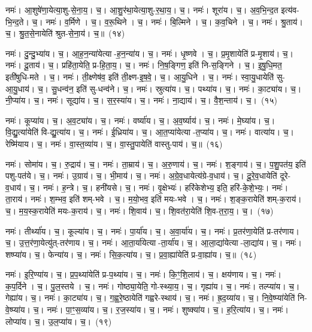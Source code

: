 नमः॑। आ॒शुषे॑णा॒येत्या॒शु-से॒ना॒य॒। च॒। आ॒शु॒र॑था॒येत्या॒शु-र॒था॒य॒। च॒। 
नमः॑। शूरा॑य। च॒। अ॒व॒भि॒न्द॒त इत्य॑व-भि॒न्द॒ते। च॒। 
नमः॑। व॒र्मिणे। च॒। व॒रू॒थिने। च॒। 
नमः॑। बि॒ल्मिने। च॒। क॒व॒चिने। च॒। 
नमः॑। श्रु॒ताय॑। च॒। श्रु॒त॒से॒नायेति॑ श्रुत-से॒ना॒य॑। च॒॥~(१४)


नमः॑। दु॒न्दु॒भ्या॑य। च॒। आ॒ह॒न॒न्या॑येत्या-ह॒न॒न्या॑य। च॒। 
नमः॑। धृ॒ष्णवे। च॒। प्र॒मृ॒शायेति॑ प्र-मृ॒शाय॑। च॒। 
नमः॑। दू॒ताय॑। च॒। प्रहि॑ता॒येति॒ प्र-हि॒ता॒य॒। च॒। 
नमः॑। नि॒ष॒ङ्गिण॒ इति॑ नि-स॒ङ्गिने। च॒। इ॒षु॒धि॒मत॒ इती॑षुधि-मते। च॒। 
नमः॑। ती॒क्ष्णेष॑व॒ इति॑ ती॒क्ष्ण-इ॒ष॒वे॒। च॒। आ॒यु॒धिने। च॒। 
नमः॑। स्वा॒यु॒धायेति॑ सु-आ॒यु॒धाय॑। च॒। सु॒धन्व॑न॒ इति॑ सु-धन्व॑ने। च॒। 
नमः॑। स्रुत्या॑य। च॒। पथ्या॑य। च॒। 
नमः॑। का॒ट्या॑य। च॒। नी॒प्या॑य। च॒। 
नमः॑। सूद्या॑य। च॒। स॒र॒स्या॑य। च॒। 
नमः॑। ना॒द्याय॑। च॒। वै॒श॒न्ताय॑। च॒।~(१५)


नमः॑। कूप्या॑य। च॒। अ॒व॒ट्या॑य। च॒। 
नमः॑। वर्ष्या॑य। च॒। अ॒व॒र्ष्याय॑। च॒। 
नमः॑। मे॒घ्या॑य। च॒। वि॒द्यु॒त्या॑येति॑ वि-द्यु॒त्या॑य। च॒। 
नमः॑। ई॒ध्रिया॑य। च॒। आ॒त॒प्या॑येत्या-त॒प्या॑य। च॒। 
नमः॑। वात्या॑य। च॒। रेष्मि॑याय। च॒। 
नमः॑। वा॒स्त॒व्या॑य। च॒। वा॒स्तु॒पायेति॑ वास्तु-पाय॑। च॒॥~(१६)


नमः॑। सोमा॑य। च॒। रु॒द्राय॑। च॒। 
नमः॑। ता॒म्राय॑। च॒। अ॒रु॒णाय॑। च॒। 
नमः॑। श॒ङ्गाय॑। च॒। प॒शु॒पत॑य॒ इति॑ पशु-पत॑ये। च॒। 
नमः॑। उ॒ग्राय॑। च॒। भी॒माय॑। च॒। 
नमः॑। अ॒ग्रे॒व॒धायेत्य॑ग्रे-व॒धाय॑। च॒। दू॒रे॒व॒धायेति॑ दूरे-व॒धाय॑। च॒। 
नमः॑। ह॒न्त्रे। च॒। हनी॑यसे। च॒। 
नमः॑। वृ॒क्षेभ्यः॑। हरि॑केशेभ्य॒ इति॒ हरि॑-के॒शे॒भ्यः॒। 
नमः॑। ता॒राय॑। नमः॑। श॒म्भव॒ इति॑ शम्-भवे। च॒। म॒यो॒भव॒ इति॑ मयः-भवे। च॒। 
नमः॑। श॒ङ्क॒रायेति॑ शम्-क॒राय॑। च॒। म॒य॒स्क॒रायेति॑ मयः-क॒राय॑। च॒। 
नमः॑। शि॒वाय॑। च॒। शि॒वत॑रा॒येति॑ शि॒व-त॒रा॒य॒। च॒।~(१७)


नमः॑। तीर्थ्या॑य। च॒। कूल्या॑य। च॒। 
नमः॑। पा॒र्या॑य। च॒। अ॒वा॒र्या॑य। च॒। 
नमः॑। प्र॒तर॑णा॒येति॑ प्र-तर॑णाय। च॒। उ॒त्त॒र॑णा॒येत्यु॑त्-तर॑णाय। च॒। 
नमः॑। आ॒ता॒र्या॑येत्या-ता॒र्या॑य। च॒। आ॒ला॒द्या॑येत्या-ला॒द्या॑य। च॒। 
नमः॑। शष्प्या॑य। च॒। फेन्या॑य। च॒। 
नमः॑। सि॒क॒त्या॑य। च॒। प्र॒वा॒ह्या॑येति॑ प्र-वा॒ह्या॑य। च॒॥~(१८)


नमः॑। इ॒रि॒ण्या॑य। च॒। प्र॒प॒थ्या॑येति॑ प्र-प॒थ्या॑य। च॒। 
नमः॑। कि॒ꣳ॒शि॒लाय॑। च॒। क्षय॑णाय। च॒। 
नमः॑। क॒प॒र्दिने। च॒। पु॒ल॒स्तये। च॒। 
नमः॑। गोष्ठ्या॒येति॒ गो-स्थ्या॒य॒। च॒। गृह्या॑य। च॒। 
नमः॑। तल्प्या॑य। च॒। गेह्या॑य। च॒। 
नमः॑। का॒ट्या॑य। च॒। ग॒ह्व॒रे॒ष्ठायेति॑ गह्वरे-स्थाय॑। च॒। 
नमः॑। ह्र॒द॒य्या॑य। च॒। नि॒वे॒ष्प्या॑येति॑ नि-वे॒ष्प्या॑य। च॒। 
नमः॑। पा॒ꣳ॒स॒व्या॑य। च॒। र॒ज॒स्या॑य। च॒। 
नमः॑। शुष्क्या॑य। च॒। ह॒रि॒त्या॑य। च॒। 
नमः॑। लोप्या॑य। च॒। उ॒ल॒प्या॑य। च॒।~(१९)


